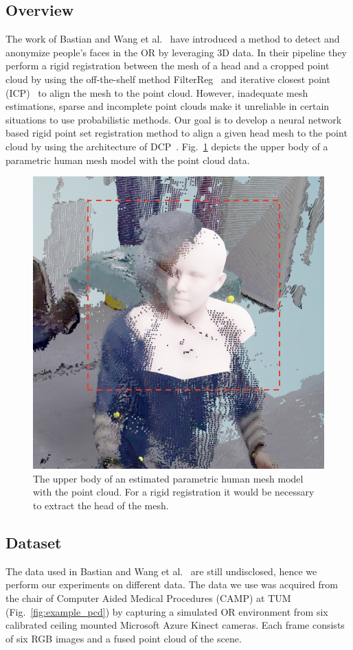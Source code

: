 \documentclass[a4paper,pagesize 10pt]{scrartcl}
\begin{document}
\subsection{Overview}
The work of Bastian and Wang et al.~\cite{disguisor} have introduced a method to detect and anonymize people's faces in the OR by leveraging 3D data.
In their pipeline they perform a rigid registration between the mesh of a head and a cropped point cloud by using the off-the-shelf method FilterReg~\cite{filterreg} and iterative closest point (ICP)~\cite{icp} to align the mesh to the point cloud. 
However, inadequate mesh estimations, sparse and incomplete point clouds make it unreliable in certain situations to use probabilistic methods.
Our goal is to develop a neural network based rigid point set registration method to align a given head mesh to the point cloud by using the architecture of DCP~\cite{dcp}.
Fig.~\ref{fig:example_mesh} depicts the upper body of a parametric human mesh model with the point cloud data.

\begin{figure}[!ht]
    \centering
    \includegraphics[width=0.75\columnwidth]{figures/issue_pointcloud.png}
    \caption{The upper body of an estimated parametric human mesh model with the point cloud. For a rigid registration it would be necessary to extract the head of the mesh.}
    \label{fig:example_mesh}
\end{figure}

\subsection{Dataset}
The data used in Bastian and Wang et al.~\cite{disguisor} are still undisclosed, hence we perform our experiments on different data.
The data we use was acquired from the chair of Computer Aided Medical Procedures (CAMP) at TUM (Fig.~\ref{fig:example_pcd}) by capturing a simulated OR environment from six calibrated ceiling mounted Microsoft Azure Kinect cameras.
Each frame consists of six RGB images and a fused point cloud of the scene.
\end{document}
